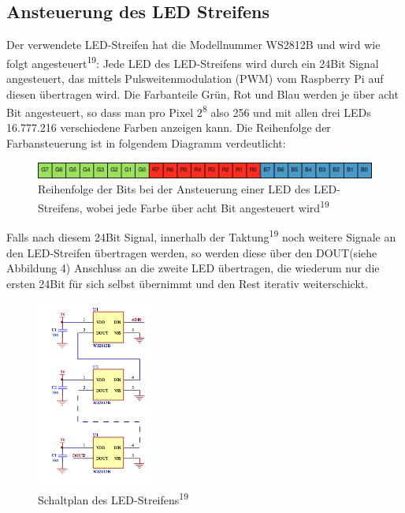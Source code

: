 \documentclass [a4paper, 11pt] {article}
\begin{document}
\subsection{Ansteuerung des LED Streifens}
Der verwendete LED-Streifen hat die Modellnummer WS2812B und wird wie folgt angesteuert\textsuperscript{19}:
Jede LED des LED-Streifens wird durch ein 24Bit Signal angesteuert, das mittels Pulsweitenmodulation (PWM) vom Raspberry Pi auf diesen übertragen wird. Die Farbanteile Grün, Rot und Blau werden je über acht Bit angesteuert, so dass man pro Pixel 2\textsuperscript 8 also 256 und mit allen drei LEDs 16.777.216 verschiedene Farben anzeigen kann. Die Reihenfolge der Farbansteuerung ist in folgendem Diagramm verdeutlicht:
\begin{figure}[H]
	\centering
	\includegraphics[width=16cm]{rgbtabelle.png}
	\caption{Reihenfolge der Bits bei der Ansteuerung einer LED des LED-Streifens, wobei jede Farbe über acht Bit angesteuert wird\textsuperscript{19}}
	\label{bits}
\end{figure}
Falls nach diesem 24Bit Signal, innerhalb der Taktung\textsuperscript{19} noch weitere Signale an den LED-Streifen übertragen werden, so werden diese über den DOUT(siehe Abbildung 4) Anschluss an die zweite LED übertragen, die wiederum nur die ersten 24Bit für sich selbst übernimmt und den Rest iterativ weiterschickt.
\begin{figure}[H]
	\centering
	\includegraphics[width=4cm]{Schaltplan_des_LED-Streifens.png}
	\caption{Schaltplan des LED-Streifens\textsuperscript{19}}
	\label{Schaltplan}
\end{figure}
\end{document}
